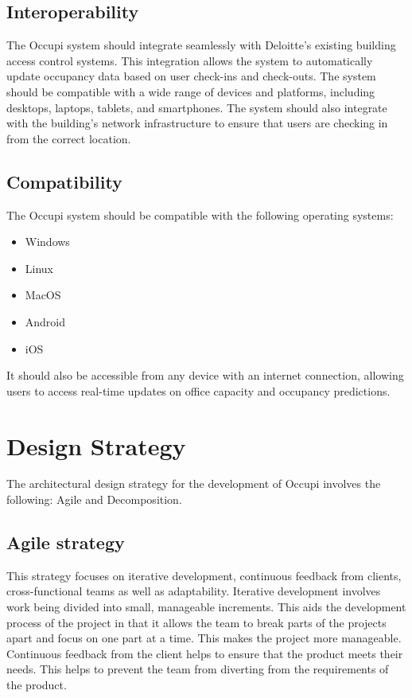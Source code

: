 \documentclass[11pt,a4paper]{article}
\begin{document}
\subsection*{Interoperability}
The Occupi system should integrate seamlessly with Deloitte’s existing building access control systems. This integration allows the system to automatically update occupancy data based on user check-ins and check-outs. The system should be compatible with a wide range of devices and platforms, including desktops, laptops, tablets, and smartphones. The system should also integrate with the building's network infrastructure to ensure that users are checking in from the correct location.

\subsection*{Compatibility}
The Occupi system should be compatible with the following operating systems:
\begin{itemize}
    \item Windows
    \item Linux
    \item MacOS
    \item Android
    \item iOS
\end{itemize}
It should also be accessible from any device with an internet connection, allowing users to access real-time updates on office capacity and occupancy predictions.

\pagebreak

\section*{Design Strategy}

The architectural design strategy for the development of Occupi involves the following: Agile and Decomposition.

\subsection*{Agile strategy}
This strategy focuses on iterative development, continuous feedback from clients, cross-functional teams as well as adaptability. Iterative development involves work being divided into small, manageable increments. This aids the development process of the project in that it allows the team to break parts of the projects apart and focus on one part at a time. This makes the project more manageable. Continuous feedback from the client helps to ensure that the product meets their needs. This helps to prevent the team from diverting from the requirements of the product.
\end{document}
